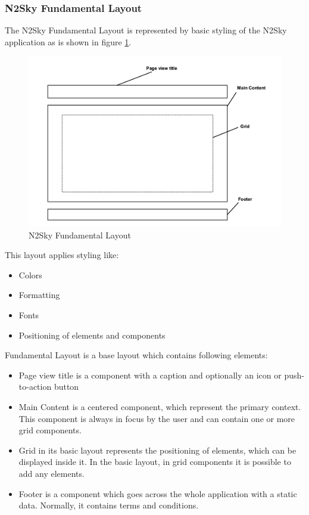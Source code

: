 \subsubsection{N2Sky Fundamental Layout}\label{N2Sky Fundamental Layout}

The N2Sky Fundamental Layout is represented by basic styling of the N2Sky application as is shown in figure \ref{fig:layout_basic}. 

\begin{figure}[H]
\begin{center}
  \includegraphics[width=\linewidth]{components/3/components/layout_basic.png}
  \caption{N2Sky Fundamental Layout}
  \label{fig:layout_basic}
\end{center}
\end{figure}

This layout applies styling like:
\begin{itemize}
\item Colors
\item Formatting
\item  Fonts
\item Positioning of elements and components
\end{itemize}



Fundamental Layout is a base layout which contains following elements:
\begin{itemize}
\item Page view title is a component with a caption and optionally an icon or push-to-action button
\item Main Content is a centered component, which represent the primary context. This component is always in focus by the user and can contain one or more grid components.
\item Grid in its basic layout represents the positioning of elements, which can be displayed inside it. In the basic layout, in grid components it is possible to add any elements. 
\item Footer is a component which goes across the whole application with a static data. Normally, it contains terms and conditions. 
\end{itemize}



